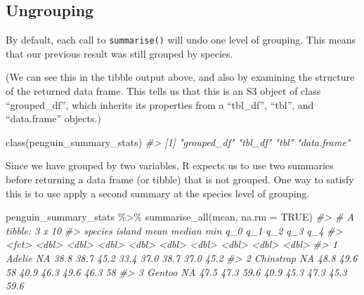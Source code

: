 \documentclass[
  12pt,
]{book}
\newenvironment{Shaded}{\begin{snugshade}}{\end{snugshade}}
\newcommand{\AttributeTok}[1]{\textcolor[rgb]{0.77,0.63,0.00}{#1}}
\newcommand{\CommentTok}[1]{\textcolor[rgb]{0.56,0.35,0.01}{\textit{#1}}}
\newcommand{\ConstantTok}[1]{\textcolor[rgb]{0.00,0.00,0.00}{#1}}
\newcommand{\FunctionTok}[1]{\textcolor[rgb]{0.00,0.00,0.00}{#1}}
\newcommand{\NormalTok}[1]{#1}
\newcommand{\SpecialCharTok}[1]{\textcolor[rgb]{0.00,0.00,0.00}{#1}}
\begin{document}
\hypertarget{ungrouping}{%
\subsection{Ungrouping}\label{ungrouping}}

By default, each call to \texttt{summarise()} will undo one level of grouping. This means that our previous result was still grouped by species.

(We can see this in the tibble output above, and also by examining the structure of the returned data frame. This tells us that this is an S3 object of class ``grouped\_df'', which inherits its properties from a ``tbl\_df'', ``tbl'', and ``data.frame'' objects.)

\begin{Shaded}
\begin{Highlighting}[]
\FunctionTok{class}\NormalTok{(penguin\_summary\_stats)}
\CommentTok{\#\textgreater{} [1] "grouped\_df" "tbl\_df"     "tbl"        "data.frame"}
\end{Highlighting}
\end{Shaded}

Since we have grouped by two variables, R expects us to use two summaries before returning a data frame (or tibble) that is not grouped. One way to satisfy this is to use apply a second summary at the species level of grouping.

\begin{Shaded}
\begin{Highlighting}[]
\NormalTok{penguin\_summary\_stats }\SpecialCharTok{\%\textgreater{}\%} 
  \FunctionTok{summarise\_all}\NormalTok{(mean, }\AttributeTok{na.rm =} \ConstantTok{TRUE}\NormalTok{)}
\CommentTok{\#\textgreater{} \# A tibble: 3 x 10}
\CommentTok{\#\textgreater{}   species   island  mean median   min   q\_0   q\_1   q\_2   q\_3   q\_4}
\CommentTok{\#\textgreater{}   \textless{}fct\textgreater{}      \textless{}dbl\textgreater{} \textless{}dbl\textgreater{}  \textless{}dbl\textgreater{} \textless{}dbl\textgreater{} \textless{}dbl\textgreater{} \textless{}dbl\textgreater{} \textless{}dbl\textgreater{} \textless{}dbl\textgreater{} \textless{}dbl\textgreater{}}
\CommentTok{\#\textgreater{} 1 Adelie        NA  38.8   38.7  45.2  33.4  37.0  38.7  37.0  45.2}
\CommentTok{\#\textgreater{} 2 Chinstrap     NA  48.8   49.6  58    40.9  46.3  49.6  46.3  58  }
\CommentTok{\#\textgreater{} 3 Gentoo        NA  47.5   47.3  59.6  40.9  45.3  47.3  45.3  59.6}
\end{Highlighting}
\end{Shaded}
\end{document}

